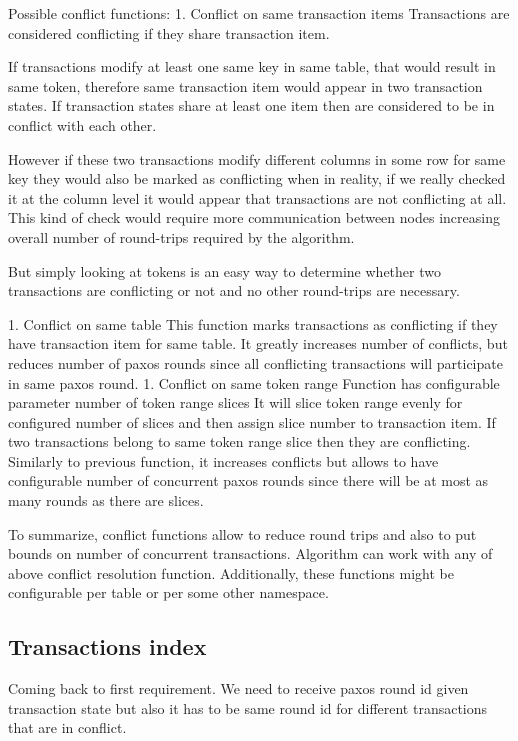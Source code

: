 Possible conflict functions:
1. Conflict on same transaction items
Transactions are considered conflicting if they share transaction item.


If transactions modify at least one same key in same table, that would result in same token, therefore same transaction item would appear in two transaction states. If transaction states share at least one item then are considered to be in conflict with each other.


However if these two transactions modify different columns in some row for same key they would also be marked as conflicting when in reality, if we really checked it at the column level it would appear that transactions are not conflicting at all. This kind of check would require more communication between nodes increasing overall number of round-trips required by the algorithm.


But simply looking at tokens is an easy way to determine whether two transactions are conflicting or not and no other round-trips are necessary.


1. Conflict on same table
        This function marks transactions as conflicting if they have transaction item for same table. It greatly increases number of conflicts, but reduces number of paxos rounds since all conflicting transactions will participate in same paxos round.
1. Conflict on same token range
        Function has configurable parameter number of token range slices
        It will slice token range evenly for configured number of slices and then assign slice number to transaction item. If two transactions belong to same token range slice then they are conflicting.
        Similarly to previous function, it increases conflicts but allows to have configurable number of concurrent paxos rounds since there will be at most as many rounds as there are slices.


To summarize, conflict functions allow to reduce round trips and also to put bounds on number of concurrent transactions. Algorithm can work with any of above conflict resolution function. Additionally, these functions might be configurable per table or per some other namespace. 




\subsection{Transactions index}


Coming back to first requirement. We need to receive paxos round id given transaction state but also it has to be same round id for different transactions that are in conflict.


